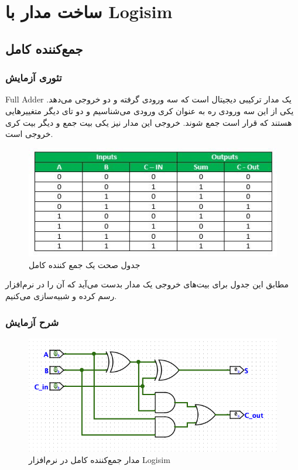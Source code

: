\chapter{
ساخت مدار با
Logisim
}
\section{جمع‌کننده کامل}
\subsection*{تئوری آزمایش}
Full Adder
یک مدار ترکیبی دیجیتال است که سه ورودی گرفته و دو خروجی می‌دهد.
یکی از این سه ورودی ره به عنوان کری ورودی می‌شناسیم و دو تای دیگر متغییرهایی هستند که قرار است جمع شوند.
خروجی این مدار نیز یکی بیت جمع و دیگر بیت کری خروجی است.

\begin{figure}[h]
\centering
\includegraphics[scale=1]{Experimental Methods/table.jpg}
\caption{جدول صحت
یک جمع کننده کامل
}
\end{figure}

مطابق این جدول برای بیت‌های خروجی یک مدار بدست می‌آید که آن را در نرم‌افزار رسم کرده و شبیه‌سازی می‌کنیم.

\subsection{شرح آزمایش}
\begin{figure}[h]
\centering
\includegraphics[scale=0.6]{Experimental Methods/1.png}
\caption{
مدار جمع‌کننده کامل در نرم‌افزار
Logisim
}
\end{figure}

